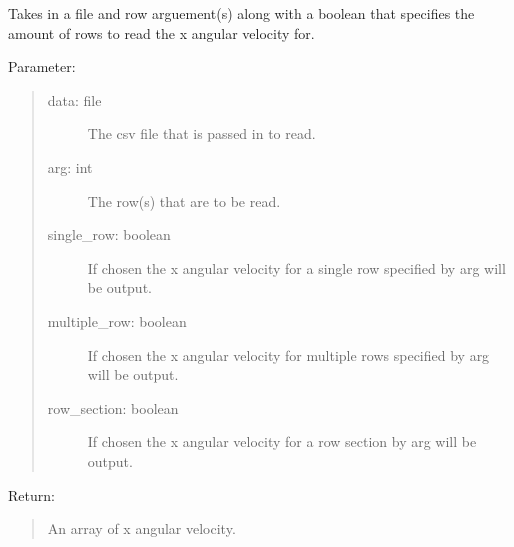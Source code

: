 \documentclass[letterpaper,10pt,english]{sphinxmanual}
\begin{document}
\begin{fulllineitems}
\label{\detokenize{Lidar extraction tool:imu_extract.get_x_ang_vel}}
Takes in a file and row arguement(s) along with a boolean that specifies the amount of rows to read the x angular velocity for.

Parameter:
\begin{quote}
\begin{description}
\item[{data: file}] \leavevmode
The csv file that is passed in to read.

\item[{arg: int}] \leavevmode
The row(s) that are to be read.

\item[{single\_row: boolean}] \leavevmode
If chosen the x angular velocity for a single row specified by arg will be output.

\item[{multiple\_row: boolean}] \leavevmode
If chosen the x angular velocity for multiple rows specified by arg will be output.

\item[{row\_section: boolean}] \leavevmode
If chosen the x angular velocity for a row section by arg will be output.

\end{description}
\end{quote}

Return:
\begin{quote}

An array of x angular velocity.
\end{quote}

\end{fulllineitems}

\end{document}
